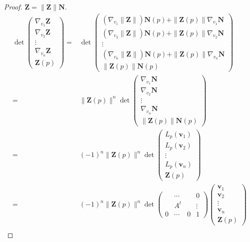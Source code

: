 \begin{proof}
	$\mathbf{Z} = \|\mathbf{Z}\|\mathbf{N}$.
\begingroup \allowdisplaybreaks
\begin{align*}
	\det \begin{pmatrix} 
		\nabla_{v_1} \mathbf{Z} \\
		\nabla_{v_2} \mathbf{Z} \\
		\vdots \\
		\nabla_{v_n} \mathbf{Z} \\
		\mathbf{Z}(p)
	\end{pmatrix} = & \det \begin{pmatrix}
		\left( \nabla_{v_1}\|\mathbf{Z}\|\right) \mathbf{N}(p) + \| \mathbf{Z}(p)\|\nabla_{v_1}\mathbf{N} \\
		\left( \nabla_{v_2}\|\mathbf{Z}\|\right) \mathbf{N}(p) + \| \mathbf{Z}(p)\|\nabla_{v_2}\mathbf{N} \\
		\vdots \\
		\left( \nabla_{v_n}\|\mathbf{Z}\|\right) \mathbf{N}(p) + \| \mathbf{Z}(p)\|\nabla_{v_n}\mathbf{N} \\
		\|\mathbf{Z}(p)\|\mathbf{N}(p)
	\end{pmatrix} \\
	= & \|\mathbf{Z}(p)\|^n \det \begin{pmatrix}
		\nabla_{v_1} \mathbf{N} \\
		\nabla_{v_2} \mathbf{N} \\
		\vdots\\
		\nabla_{v_n} \mathbf{N} \\
		\|\mathbf{Z}(p)\|\mathbf{N}(p)
	\end{pmatrix} \\
	= & (-1)^n \|\mathbf{Z}(p)\|^n \det \begin{pmatrix}
		L_p(\mathbf{v}_1) \\
		L_p(\mathbf{v}_2) \\
		\vdots \\
		L_p(\mathbf{v}_n) \\
		\mathbf{Z}(p)
	\end{pmatrix} \\
	= & (-1)^n \|\mathbf{Z}(p)\|^n \det \begin{pmatrix}
		& \cdots & & 0 \\
		& A^t & & \vdots \\
		0 & \cdots & 0 & 1 
		\end{pmatrix} \begin{pmatrix} \mathbf{v}_1 \\ \mathbf{v}_2 \\ \vdots \\ \mathbf{v}_n \\ \mathbf{Z}(p) \end{pmatrix} \\

\end{align*}
\end{proof}
